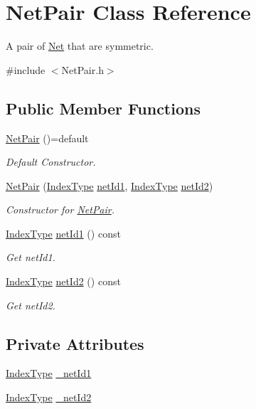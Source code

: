\hypertarget{classNetPair}{}\section{Net\+Pair Class Reference}
\label{classNetPair}


A pair of \hyperlink{classNet}{Net} that are symmetric.  




{\ttfamily \#include $<$Net\+Pair.\+h$>$}

\subsection*{Public Member Functions}
\begin{DoxyCompactItemize}
\item 
\hyperlink{classNetPair_a49a3fe4ad4e8a235a6e63f556546fd4a}{Net\+Pair} ()=default
\begin{DoxyCompactList}\small\item\em Default Constructor. \end{DoxyCompactList}\item 
\hyperlink{classNetPair_a202b7e705b1958c76c7608a636968e70}{Net\+Pair} (\hyperlink{type_8h_a581e8093e28e7362f2b6937296190676}{Index\+Type} \hyperlink{classNetPair_af1c6bf90836ede9e23922283eb1f6ddb}{net\+Id1}, \hyperlink{type_8h_a581e8093e28e7362f2b6937296190676}{Index\+Type} \hyperlink{classNetPair_a17069b7125980ea5dee5d62741bd06f8}{net\+Id2})
\begin{DoxyCompactList}\small\item\em Constructor for \hyperlink{classNetPair}{Net\+Pair}. \end{DoxyCompactList}\item 
\hyperlink{type_8h_a581e8093e28e7362f2b6937296190676}{Index\+Type} \hyperlink{classNetPair_af1c6bf90836ede9e23922283eb1f6ddb}{net\+Id1} () const
\begin{DoxyCompactList}\small\item\em Get net\+Id1. \end{DoxyCompactList}\item 
\hyperlink{type_8h_a581e8093e28e7362f2b6937296190676}{Index\+Type} \hyperlink{classNetPair_a17069b7125980ea5dee5d62741bd06f8}{net\+Id2} () const
\begin{DoxyCompactList}\small\item\em Get net\+Id2. \end{DoxyCompactList}\end{DoxyCompactItemize}
\subsection*{Private Attributes}
\begin{DoxyCompactItemize}
\item 
\hyperlink{type_8h_a581e8093e28e7362f2b6937296190676}{Index\+Type} \hyperlink{classNetPair_a0fb84b09859d2fecc32a91b63f46a90b}{\+\_\+net\+Id1}
\item 
\hyperlink{type_8h_a581e8093e28e7362f2b6937296190676}{Index\+Type} \hyperlink{classNetPair_a3ef7abb0edf2445be086f4f1202437ba}{\+\_\+net\+Id2}
\end{DoxyCompactItemize}


